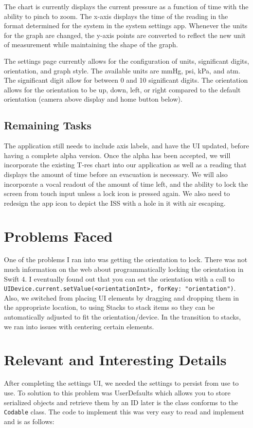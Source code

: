 \documentclass[onecolumn, draftclsnofoot,10pt, compsoc]{IEEEtran}
\begin{document}
    The chart is currently displays the current pressure as a function of time with the ability to pinch to zoom.
    The x-axis displays the time of the reading in the format determined for the system in the system settings app.
    Whenever the units for the graph are changed, the y-axis points are converted to reflect the new unit of measurement while maintaining the shape of the graph.

    The settings page currently allows for the configuration of units, significant digits, orientation, and graph style.
    The available units are mmHg, psi, kPa, and atm.
    The significant digit allow for between 0 and 10 significant digits.
    The orientation allows for the orientation to be up, down, left, or right compared to the default orientation (camera above display and home button below).

    \subsection{Remaining Tasks}
        The application still needs to include axis labels, and have the UI updated, before having a complete alpha version.
        Once the alpha has been accepted, we will incorporate the existing T-res chart into our application as well as a reading that displays the amount of time before an evacuation is necessary.
        We will also incorporate a vocal readout of the amount of time left, and the ability to lock the screen from touch input unless a lock icon is pressed again.
        We also need to redesign the app icon to depict the ISS with a hole in it with air escaping.

\section{Problems Faced}
    One of the problems I ran into was getting the orientation to lock.
    There was not much information on the web about programmatically locking the orientation in Swift 4.
    I eventually found out that you can set the orientation with a call to \texttt{UIDevice.current.setValue(<orientationInt>, forKey: "orientation")}.
    Also, we switched from placing UI elements by dragging and dropping them in the appropriate location, to using Stacks to stack items so they can be automatically adjusted to fit the orientation/device.
    In the transition to stacks, we ran into issues with centering certain elements.

\section{Relevant and Interesting Details}
    After completing the settings UI, we needed the settings to persist from use to use.
    To solution to this problem was UserDefaults which allows you to store serialized objects and retrieve them by an ID later is the class conforms to the \texttt{Codable} class.
    The code to implement this was very easy to read and implement and is as follows:
\end{document}
